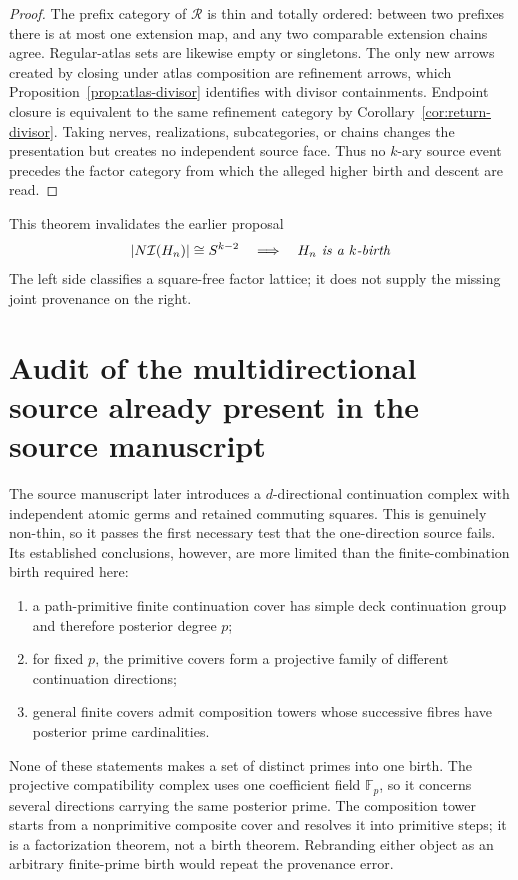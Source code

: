 \documentclass[11pt]{article}
\begin{document}
\begin{proof}
The prefix category of \(\mathscr R\) is thin and totally ordered: between two
prefixes there is at most one extension map, and any two comparable extension
chains agree.  Regular-atlas sets are likewise empty or singletons.  The only
new arrows created by closing under atlas composition are refinement arrows,
which Proposition~\ref{prop:atlas-divisor} identifies with divisor
containments.  Endpoint closure is equivalent to the same refinement
category by Corollary~\ref{cor:return-divisor}.  Taking nerves, realizations,
subcategories, or chains changes the presentation but creates no independent
source face.  Thus no \(k\)-ary source event precedes the factor category from
which the alleged higher birth and descent are read.
\end{proof}

This theorem invalidates the earlier proposal
\[
\left|N\mathcal I(H_n)\right|\cong S^{k-2}
\quad\Longrightarrow\quad
\text{\emph{\(H_n\) is a \(k\)-birth}}
\]
The left side classifies a square-free factor lattice; it does not supply the
missing joint provenance on the right.

\section{Audit of the multidirectional source already present in the source manuscript}

The source manuscript later introduces a \(d\)-directional continuation
complex with independent atomic germs and retained commuting squares.  This
is genuinely non-thin, so it passes the first necessary test that the
one-direction source fails.  Its established conclusions, however, are more
limited than the finite-combination birth required here:

\begin{enumerate}[label=(\roman*)]
\item a path-primitive finite continuation cover has simple deck continuation
group and therefore posterior degree \(p\);
\item for fixed \(p\), the primitive covers form a projective family of
different continuation directions;
\item general finite covers admit composition towers whose successive fibres
have posterior prime cardinalities.
\end{enumerate}

None of these statements makes a set of distinct primes into one birth.  The
projective compatibility complex uses one coefficient field
\(\mathbb F_p\), so it concerns several directions carrying the same posterior
prime.  The composition tower starts from a nonprimitive composite cover and
resolves it into primitive steps; it is a factorization theorem, not a birth
theorem.  Rebranding either object as an arbitrary finite-prime birth would
repeat the provenance error.
\end{document}
